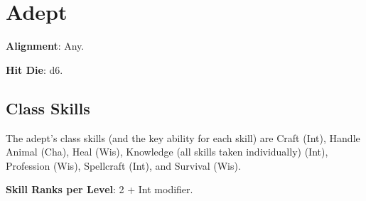 \section{Adept}

\label{f0}				
\textbf{Alignment}: Any.
				
\textbf{Hit Die}: d6.
				
\subsection{Class Skills}

				
The adept's class skills (and the key ability for each skill) are Craft (Int), Handle Animal (Cha), Heal (Wis), Knowledge (all skills taken individually) (Int), Profession (Wis), Spellcraft (Int), and Survival (Wis). 
				
\textbf{Skill Ranks per Level}: 2 + Int modifier.
